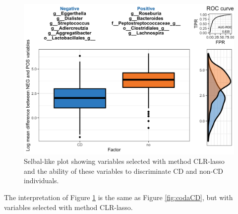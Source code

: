 \documentclass[openany]{book}
\newenvironment{Shaded}{\begin{snugshade}}{\end{snugshade}}
\newcommand{\KeywordTok}[1]{\textcolor[rgb]{0.13,0.29,0.53}{\textbf{#1}}}
\newcommand{\DataTypeTok}[1]{\textcolor[rgb]{0.13,0.29,0.53}{#1}}
\newcommand{\StringTok}[1]{\textcolor[rgb]{0.31,0.60,0.02}{#1}}
\newcommand{\CommentTok}[1]{\textcolor[rgb]{0.56,0.35,0.01}{\textit{#1}}}
\newcommand{\OtherTok}[1]{\textcolor[rgb]{0.56,0.35,0.01}{#1}}
\newcommand{\OperatorTok}[1]{\textcolor[rgb]{0.81,0.36,0.00}{\textbf{#1}}}
\newcommand{\NormalTok}[1]{#1}
\begin{document}
\begin{figure}

{\centering \includegraphics[width=1\linewidth]{./Generated_plots/clrCD-1} 

}

\caption{Selbal-like plot showing variables selected with method CLR-lasso and the ability of these variables to discriminate CD and non-CD individuals.}\label{fig:clrCD}
\end{figure}

The interpretation of Figure \ref{fig:clrCD} is the same as Figure
\ref{fig:codaCD}, but with variables selected with method CLR-lasso.

\begin{Shaded}
\end{Shaded}
\end{document}
